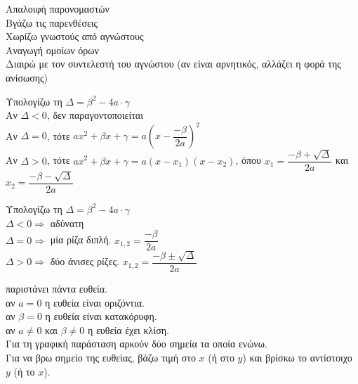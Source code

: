 \documentclass[a4paper,landscape,10pt]{article}
\begin{document}
\begin{multicols}{3}
\mybullet Απαλοιφή παρονομαστών \\
\mybullet Βγάζω τις παρενθέσεις \\
\mybullet Χωρίζω γνωστούς από αγνώστους \\
\mybullet Αναγωγή ομοίων όρων \\
\mybullet Διαιρώ με τον συντελεστή του αγνώστου (αν είναι αρνητικός, 
αλλάζει η φορά της ανίσωσης) 


\mybullet Υπολογίζω τη $\Delta=\beta^2-4a\cdot\gamma$ \\
\mybullet Αν $\Delta<0$, δεν παραγοντοποιείται \\
\mybullet Αν $\Delta=0$, τότε $ax^2+\beta x+\gamma=a\left(x-\dfrac{-\beta}{2a}\right)^2$ \\
\mybullet Αν $\Delta>0$, τότε $ax^2+\beta x+\gamma=a(x-x_1)(x-x_2)$, όπου 
$x_1=\dfrac{-\beta+\sqrt{\Delta}}{2a}$ και $x_2=\dfrac{-\beta-\sqrt{\Delta}}{2a}$ 



\mybullet Υπολογίζω τη $\Delta=\beta^2-4a\cdot\gamma$ \\
\mybullet $\Delta<0\Rightarrow$ αδύνατη \\
\mybullet $\Delta=0\Rightarrow$ μία ρίζα διπλή. $x_{1,2}=\dfrac{-\beta}{2a}$ \\
\mybullet $\Delta>0\Rightarrow$ δύο άνισες ρίζες. $x_{1,2}=\dfrac{-\beta\pm\sqrt{\Delta}}{2a}$ 


\mybullet παριστάνει πάντα ευθεία. \\
\mybullet αν $a=0$ η ευθεία είναι οριζόντια. \\
\mybullet αν $\beta=0$ η ευθεία είναι κατακόρυφη. \\
\mybullet αν $a\ne0$ και $\beta\ne0$ η ευθεία έχει κλίση. \\
\mybullet Για τη γραφική παράσταση αρκούν δύο σημεία τα οποία ενώνω. \\
\mybullet Για να βρω σημείο της ευθείας, βάζω τιμή στο $x$ (ή στο $y$) 
και βρίσκω το αντίστοιχο $y$ (ή το $x$). \\


\end{multicols}
\end{document}
